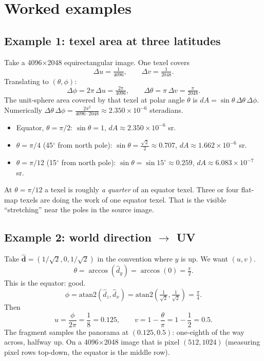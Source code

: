 \documentclass{article}
\begin{document}
\section{Worked examples}

\subsection*{Example 1: texel area at three latitudes}

Take a 4096$\times$2048 equirectangular image. One texel covers
\[
  \Delta u = \tfrac{1}{4096}, \qquad \Delta v = \tfrac{1}{2048}.
\]
Translating to $(\theta, \phi)$:
\[
  \Delta \phi = 2\pi \, \Delta u = \tfrac{2\pi}{4096}, \qquad
  \Delta \theta = \pi \, \Delta v = \tfrac{\pi}{2048}.
\]
The unit-sphere area covered by that texel at polar angle $\theta$ is
$dA = \sin\theta \, \Delta\theta \, \Delta\phi$. Numerically
$\Delta\theta \, \Delta\phi = \tfrac{2\pi^2}{4096 \cdot 2048} \approx 2.350 \times 10^{-6}$
steradians.

\begin{itemize}
  \item Equator, $\theta = \pi/2$: $\sin\theta = 1$, $dA \approx 2.350 \times 10^{-6}$ sr.
  \item $\theta = \pi/4$ (45$^\circ$ from north pole): $\sin\theta = \tfrac{\sqrt{2}}{2} \approx 0.707$, $dA \approx 1.662 \times 10^{-6}$ sr.
  \item $\theta = \pi/12$ (15$^\circ$ from north pole): $\sin\theta = \sin 15^\circ \approx 0.259$, $dA \approx 6.083 \times 10^{-7}$ sr.
\end{itemize}
At $\theta = \pi/12$ a texel is roughly \emph{a quarter} of an equator texel.
Three or four flat-map texels are doing the work of one equator texel. That
is the visible ``stretching'' near the poles in the source image.

\subsection*{Example 2: world direction $\to$ UV}

Take $\hat{\mathbf{d}} = (1/\sqrt{2}, 0, 1/\sqrt{2})$ in the convention where
$y$ is up. We want $(u, v)$.
\[
  \theta = \arccos(\hat{d}_y) = \arccos(0) = \tfrac{\pi}{2}.
\]
This is the equator: good.
\[
  \phi = \mathrm{atan2}(\hat{d}_z, \hat{d}_x) = \mathrm{atan2}\!\left(\tfrac{1}{\sqrt{2}}, \tfrac{1}{\sqrt{2}}\right) = \tfrac{\pi}{4}.
\]
Then
\[
  u = \frac{\phi}{2\pi} = \frac{1}{8} = 0.125, \qquad v = 1 - \frac{\theta}{\pi} = 1 - \frac{1}{2} = 0.5.
\]
The fragment samples the panorama at $(0.125, 0.5)$: one-eighth of the way
across, halfway up. On a 4096$\times$2048 image that is pixel $(512, 1024)$
(measuring pixel rows top-down, the equator is the middle row).
\end{document}
